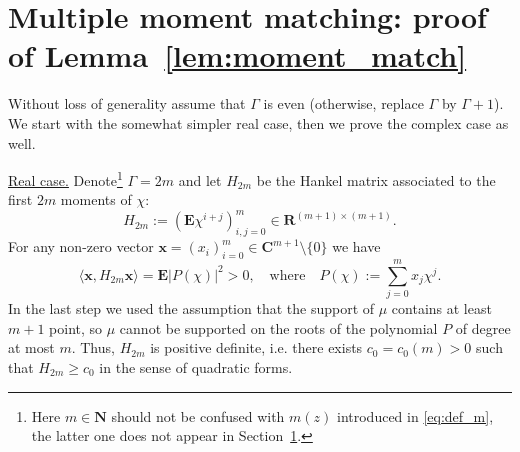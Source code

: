 \documentclass[10pt]{amsart}
\numberwithin{equation}{section}
\newcommand{\E}{\mathbf{E}}
\newcommand{\R}{\mathbf{R}}
\newcommand{\C}{\mathbf{C}}
\newcommand{\N}{\mathbf{N}}
\begin{document}
\section{Multiple moment matching: proof of Lemma~\ref{lem:moment_match}}\label{sec:moment_match}

Without loss of generality assume that $\Gamma$ is even (otherwise, replace $\Gamma$ by $\Gamma+1$). We start with the somewhat simpler real case, then we prove the complex case as well.

\noindent\underline{Real case.} Denote\footnote{Here $m\in\N$ should not be confused with $m(z)$ introduced in \eqref{eq:def_m}, the latter one does not appear in Section~\ref{sec:moment_match}.} $\Gamma=2m$ and let $H_{2m}$ be the Hankel matrix associated to the first $2m$ moments of $\chi$:
\begin{equation*}
H_{2m}:=\left( \E \chi^{i+j}\right)_{i,j=0}^{m}\in  \R^{(m+1)\times (m+1)}.
\end{equation*}
For any non-zero vector $\bm{x}=(x_i)_{i=0}^m\in\C^{m+1}\setminus\{0\}$ we have
\begin{equation*}
\langle \bm{x}, H_{2m}\bm{x}\rangle = \E \left\vert P(\chi) \right\vert^2 >0,\quad \text{where}\quad P(\chi):= \sum_{j=0}^m x_j \chi^j.
\end{equation*}
In the last step we used the assumption that the support of $\mu$ contains at least $m+1$ point, so $\mu$ cannot be supported on the roots of the polynomial $P$ of degree at most $m$. Thus, $H_{2m}$ is positive definite, i.e. there exists $c_0 = c_0(m) >0$ such that $H_{2m}\ge c_0$ in the sense of quadratic forms.
\end{document}
